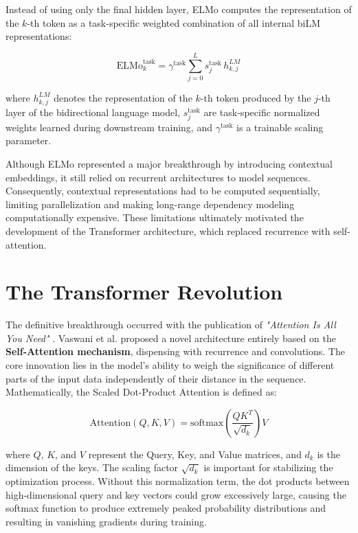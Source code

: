 Instead of using only the final hidden layer, ELMo computes the representation of the $k$-th token as a task-specific weighted combination of all internal biLM representations:

\begin{equation*}
\mathrm{ELMo}^{\text{task}}_k
=
\gamma^{\text{task}}
\sum_{j=0}^{L}
s^{\text{task}}_j\, h^{LM}_{k,j}
\end{equation*}

where $h^{LM}_{k,j}$ denotes the representation of the $k$-th token produced by the $j$-th layer of the bidirectional language model, $s^{\text{task}}_j$ are task-specific normalized weights learned during downstream training, and $\gamma^{\text{task}}$ is a trainable scaling parameter.


Although ELMo represented a major breakthrough by introducing contextual embeddings, it still relied on recurrent architectures to model sequences. Consequently, contextual representations had to be computed sequentially, limiting parallelization and making long-range dependency modeling computationally expensive. These limitations ultimately motivated the development of the Transformer architecture, which replaced recurrence with self-attention.



\section{The Transformer Revolution}
The definitive breakthrough occurred with the publication of \textit{"Attention Is All You Need"} \cite{vaswani2017attention}. Vaswani et al. proposed a novel architecture entirely based on the \textbf{Self-Attention mechanism}, dispensing with recurrence and convolutions. The core innovation lies in the model's ability to weigh the significance of different parts of the input data independently of their distance in the sequence. Mathematically, the Scaled Dot-Product Attention is defined as:

\begin{equation}
    \text{Attention}(Q, K, V) = \text{softmax}\left(\frac{QK^T}{\sqrt{d_k}}\right)V
\end{equation}

where $Q$, $K$, and $V$ represent the Query, Key, and Value matrices, and $d_k$ is the dimension of the keys. The scaling factor $\sqrt{d_k}$ is important for stabilizing the optimization process. Without this normalization term, the dot products between high-dimensional query and key vectors could grow excessively large, causing the softmax function to produce extremely peaked probability distributions and resulting in vanishing gradients during training.

